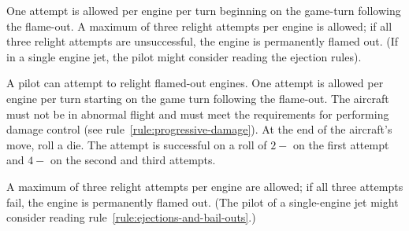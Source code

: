 \begin{advancedrules}
{One attempt is allowed per engine per turn beginning on the game-turn following the flame-out. A maximum of three relight attempts per engine is allowed; if all three relight attempts are unsuccessful, the engine is permanently flamed out. (If in a single engine jet, the pilot might consider reading the ejection rules).
}{
A pilot can attempt to relight flamed-out engines. One attempt is allowed per engine per turn starting on the game turn following the flame-out. The aircraft must not be in abnormal flight and must meet the requirements for performing damage control (see rule~\ref{rule:progressive-damage}). At the end of the aircraft's move, roll a die. The attempt is successful on a roll of $2-$ on the first attempt and $4-$ on the second and third attempts.

A maximum of three relight attempts per engine are allowed; if all three attempts fail, the engine is permanently flamed out. (The pilot of a single-engine jet might consider reading rule~\ref{rule:ejections-and-bail-outs}.)
}


\end{advancedrules}
